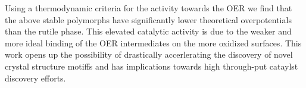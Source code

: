 %
Using a thermodynamic criteria for the activity towards the OER we find that the above stable \IrOthree polymorphs have significantly lower theoretical overpotentials than the rutile \IrOtwo phase.
%
This elevated catalytic activity is due to the weaker and more ideal binding of the OER intermediates on the more oxidized \IrOthree surfaces.
%
This work opens up the possibility of drastically accerlerating the discovery of novel crystal structure motiffs and has implications towards high through-put cataylst discovery efforts.
